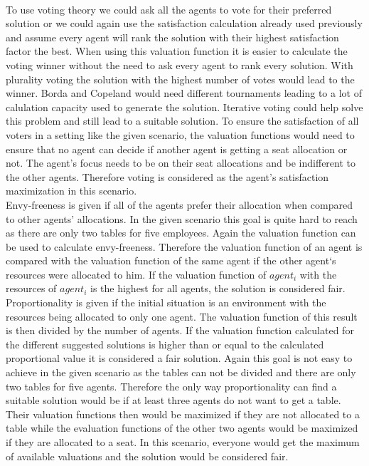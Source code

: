 \documentclass[german, a4paper, 11pt, oneside]{scrbook}
\begin{document}
\\To use voting theory we could ask all the agents to vote for their preferred solution or we could again use the satisfaction calculation already used previously and assume every agent will rank the solution with their highest satisfaction factor the best. When using this valuation function it is easier to calculate the voting winner without the need to ask every agent to rank every solution. With plurality voting the solution with the highest number of votes would lead to the winner. Borda and Copeland would need different tournaments leading to a lot of calulation capacity used to generate the solution. Iterative voting could help solve this problem and still lead to a suitable solution. To ensure the satisfaction of all voters in a setting like the given scenario, the valuation functions would need to ensure that no agent can decide if another agent is getting a seat allocation or not. The agent's focus needs to be on their seat allocations and be indifferent to the other agents. Therefore voting is considered as the agent's satisfaction maximization in this scenario.
\\Envy-freeness is given if all of the agents prefer their allocation when compared to other agents' allocations. In the given scenario this goal is quite hard to reach as there are only two tables for five employees. Again the valuation function can be used to calculate envy-freeness. Therefore the valuation function of an agent is compared with the valuation function of the same agent if the other agent`s resources were allocated to him. If the valuation function of $agent_i$ with the resources of $agent_i$ is the highest for all agents, the solution is considered fair.
\\Proportionality is given if the initial situation is an environment with the resources being allocated to only one agent. The valuation function of this result is then divided by the number of agents. If the valuation function calculated for the different suggested solutions is higher than or equal to the calculated proportional value it is considered a fair solution. Again this goal is not easy to achieve in the given scenario as the tables can not be divided and there are only two tables for five agents. Therefore the only way proportionality can find a suitable solution would be if at least three agents do not want to get a table. Their valuation functions then would be maximized if they are not allocated to a table while the evaluation functions of the other two agents would be maximized if they are allocated to a seat. In this scenario, everyone would get the maximum of available valuations and the solution would be considered fair.
\end{document}
